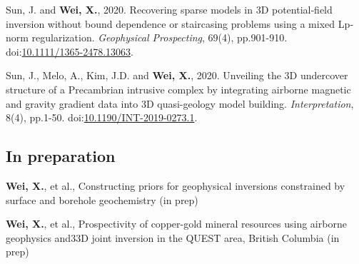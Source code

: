 \documentclass[11pt, a4paper]{article}
\newcommand{\LastName}{Wei}
\newcommand{\Initials}{X}
\newcommand{\Wei}{\textbf{\LastName, \Initials.}}  %
\newcommand{\DOI}[1]{doi:\href{https://doi.org/#1}{#1}}
\begin{document}
\begin{etaremune}
	\item
	Sun, J. and \Wei, 2020. Recovering sparse models in 3D potential‐field inversion without bound dependence or staircasing problems using a mixed Lp‐norm regularization. \emph{Geophysical Prospecting}, 69(4), pp.901-910.
	\DOI{10.1111/1365-2478.13063}.

	\item
	Sun, J., Melo, A., Kim, J.D. and \Wei, 2020. Unveiling the 3D undercover structure of a Precambrian intrusive complex by integrating airborne magnetic and gravity gradient data into 3D quasi-geology model building. \emph{Interpretation}, 8(4), pp.1-50.
	\DOI{10.1190/INT-2019-0273.1}.

\end{etaremune}


\subsection*{In preparation}
\begin{etaremune}
	\item
	\Wei, et al., Constructing priors for geophysical inversions constrained by surface and borehole geochemistry (in prep)

	\item
	\Wei, et al., Prospectivity of copper-gold mineral resources using airborne geophysics and33D joint inversion in the QUEST area, British Columbia (in prep)
\end{etaremune}
\end{document}
